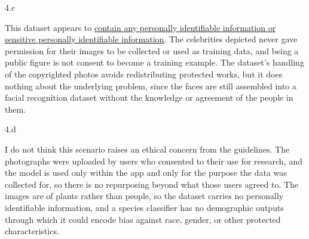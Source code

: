 \LARGE
4.c
\normalsize

\begin{answer}
  This dataset appears to \ul{contain any personally identifiable information or sensitive
  personally identifiable information}. The celebrities depicted never gave permission for their images to be collected or used as
  training data, and being a public figure is not consent to become a training example. The
  dataset's handling of the copyrighted photos avoids redistributing protected works, but it does nothing
  about the underlying problem, since the faces are still assembled into a facial recognition
  dataset without the knowledge or agreement of the people in them.
\end{answer}

\LARGE
4.d
\normalsize

\begin{answer}
  I do not think this scenario raises an ethical concern from the guidelines. The photographs
  were uploaded by users who consented to their use for research, and the model is used only within the app and
  only for the purpose the data was collected for, so there is no repurposing beyond what those
  users agreed to. The images are of plants rather than people, so the dataset carries no
  personally identifiable information, and a species classifier has no demographic outputs
  through which it could encode bias against race, gender, or other protected characteristics.
\end{answer}
\clearpage


